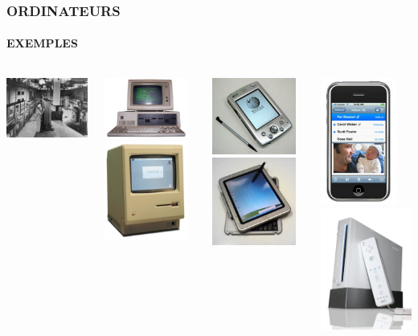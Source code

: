 \begin{frame}
\frametitle{\uppercase{Ordinateurs}}
\framesubtitle{\uppercase{Exemples}}
\begin{columns}
\column{5.5cm}
\includegraphics[width=5cm]{eniac2.jpg}

\includegraphics[width=2.75cm]{ibmpc.jpg}
\includegraphics[width=2.75cm]{macintosh.jpg}

\column{5.5cm}
\includegraphics[width=2.75cm]{pda.jpg}\hfill
\includegraphics[width=2.75cm]{tablette.jpg}

\includegraphics[width=2.5cm]{iphone.jpg}\hfill
\includegraphics[width=3cm]{wii.jpg}

\end{columns}
\end{frame}
